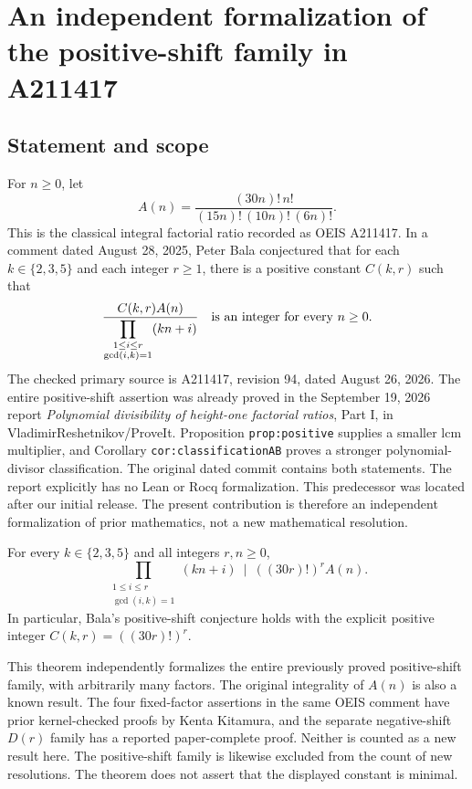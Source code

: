 \section{An independent formalization of the positive-shift family in A211417}
\label{sec:a211417-positive-shifts}

\subsection{Statement and scope}

For $n\ge0$, let
\[
 A(n)=\frac{(30n)!\,n!}{(15n)!\,(10n)!\,(6n)!}.
\]
This is the classical integral factorial ratio recorded as OEIS A211417.
In a comment dated August 28, 2025, Peter Bala conjectured that for each
$k\in\{2,3,5\}$ and each integer $r\ge1$, there is a positive constant
$C(k,r)$ such that
\[
 \frac{C(k,r)A(n)}
 {\displaystyle\prod_{\substack{1\le i\le r\\\gcd(i,k)=1}}(kn+i)}
 \quad\hbox{is an integer for every }n\ge0.
\]
The checked primary source is A211417, revision 94, dated August 26, 2026.
The entire positive-shift assertion was already proved in the September
19, 2026 report \emph{Polynomial divisibility of height-one factorial
ratios}, Part I, in VladimirReshetnikov/ProveIt. Proposition
\texttt{prop:positive} supplies a smaller lcm multiplier, and Corollary
\texttt{cor:classificationAB} proves a stronger polynomial-divisor
classification. The original dated commit contains both statements.
The report explicitly has no Lean or Rocq formalization. This predecessor
was located after our initial release. The present contribution is
therefore an independent formalization of prior mathematics, not a
new mathematical resolution.

\begin{theorem}
\label{thm:a211417-positive-shifts}
For every $k\in\{2,3,5\}$ and all integers $r,n\ge0$,
\[
 \prod_{\substack{1\le i\le r\\\gcd(i,k)=1}}(kn+i)
 \ \mid\ ((30r)!)^r A(n).
\]
In particular, Bala's positive-shift conjecture holds with the explicit
positive integer $C(k,r)=((30r)!)^r$.
\end{theorem}

This theorem independently formalizes the entire previously proved
positive-shift family, with arbitrarily many factors. The original
integrality of $A(n)$ is also a known result.  The
four fixed-factor assertions in the same OEIS comment have prior
kernel-checked proofs by Kenta Kitamura, and the separate negative-shift
$D(r)$ family has a reported paper-complete proof.  Neither is counted
as a new result here. The positive-shift family is likewise excluded
from the count of new resolutions. The theorem does not assert that the displayed
constant is minimal.

